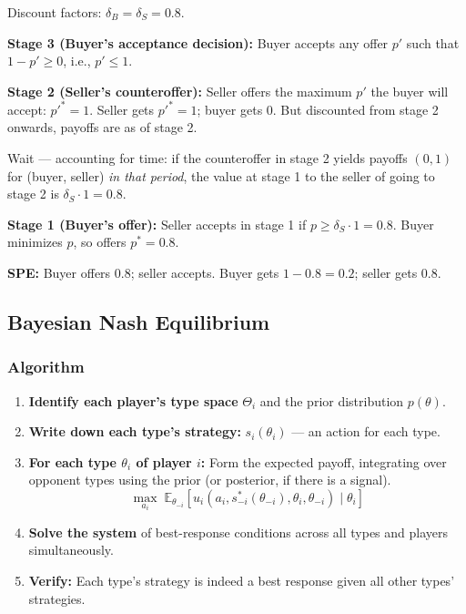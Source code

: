 \documentclass[hidelinks]{article}
\begin{document}
Discount factors: $\delta_B = \delta_S = 0.8$.

\textbf{Stage 3 (Buyer's acceptance decision):} Buyer accepts any offer $p'$ such that $1 - p' \geq 0$, i.e., $p' \leq 1$.

\textbf{Stage 2 (Seller's counteroffer):} Seller offers the maximum $p'$ the buyer will accept: $p'^* = 1$. Seller gets $p'^* = 1$; buyer gets $0$. But discounted from stage 2 onwards, payoffs are as of stage 2.

Wait — accounting for time: if the counteroffer in stage 2 yields payoffs $(0, 1)$ for (buyer, seller) \textit{in that period}, the value at stage 1 to the seller of going to stage 2 is $\delta_S \cdot 1 = 0.8$.

\textbf{Stage 1 (Buyer's offer):} Seller accepts in stage 1 if $p \geq \delta_S \cdot 1 = 0.8$. Buyer minimizes $p$, so offers $p^* = 0.8$.

\textbf{SPE:} Buyer offers $0.8$; seller accepts. Buyer gets $1 - 0.8 = 0.2$; seller gets $0.8$.

\subsection{Bayesian Nash Equilibrium}

\subsubsection{Algorithm}

\begin{enumerate}
    \item \textbf{Identify each player's type space} $\Theta_i$ and the prior distribution $p(\theta)$.
    \item \textbf{Write down each type's strategy:} $s_i(\theta_i)$ — an action for each type.
    \item \textbf{For each type $\theta_i$ of player $i$:} Form the expected payoff, integrating over opponent types using the prior (or posterior, if there is a signal).
    \[
    \max_{a_i} \; \mathbb{E}_{\theta_{-i}}\left[u_i(a_i, s_{-i}^*(\theta_{-i}), \theta_i, \theta_{-i}) \mid \theta_i\right]
    \]
    \item \textbf{Solve the system} of best-response conditions across all types and players simultaneously.
    \item \textbf{Verify:} Each type's strategy is indeed a best response given all other types' strategies.
\end{enumerate}
\end{document}
